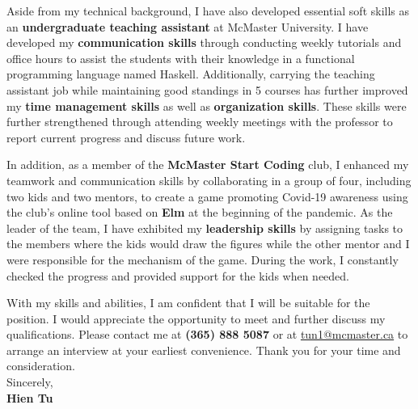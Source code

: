 \documentclass[12pt,letterpaper,sans]{moderncv} %
\begin{document}
Aside from my technical background, I have also developed essential soft skills as an \textbf{undergraduate teaching assistant} at McMaster University. I have developed my \textbf{communication skills} through conducting weekly tutorials and office hours to assist the students with their knowledge in a functional programming language named Haskell. Additionally, carrying the teaching assistant job while maintaining good standings in 5 courses has further improved my \textbf{time management skills} as well as \textbf{organization skills}. These skills were further strengthened through attending weekly meetings with the professor to report current progress and discuss future work.

In addition, as a member of the \textbf{McMaster Start Coding} club, I enhanced my teamwork and communication skills by collaborating in a group of four, including two kids and two mentors, to create a game promoting Covid-19 awareness using the club's online tool based on \textbf{Elm} at the beginning of the pandemic. As the leader of the team, I have exhibited my \textbf{leadership skills} by assigning tasks to the members where the kids would draw the figures while the other mentor and I were responsible for the mechanism of the game. During the work, I constantly checked the progress and provided support for the kids when needed.

With my skills and abilities, I am confident that I will be suitable for the position. I would appreciate the opportunity to meet and further discuss my qualifications. Please contact me at \textbf{(365) 888 5087} or at \href{mailto:tun1@mcmaster.ca}{tun1@mcmaster.ca} to arrange an interview at your earliest convenience. Thank you for your time and consideration. \\

Sincerely, \\
\textbf{Hien Tu}


\newpage

\end{document}
